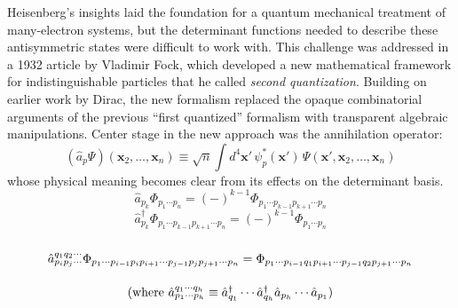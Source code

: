 Heisenberg's insights laid the foundation for a quantum mechanical treatment of
many-electron systems,\cite{Heisenberg:1926p411} but the determinant functions
needed to describe these antisymmetric states were difficult to work with.
This challenge was addressed in a 1932 article by Vladimir Fock, which developed
a new mathematical framework for indistinguishable particles that he called
{\itshape second quantization}.\cite{Fock:1932p622}
Building on earlier work by Dirac,\cite{Dirac:1927p243} the new formalism
replaced the opaque combinatorial arguments of the previous ``first quantized''
formalism with transparent algebraic manipulations.
Center stage in the new approach was the annihilation operator:
\begin{equation}
    (\hat{a}_p\Psi)(\mathbf{x}_2, \ldots, \mathbf{x}_n)
    \equiv
    \sqrt{n}
    \int
    d^4\mathbf{x}'\,
    \psi_p^*(\mathbf{x}')\,
    \Psi(\mathbf{x}', \mathbf{x}_2, \ldots, \mathbf{x}_n)
\end{equation}
whose physical meaning becomes clear from its effects on the determinant basis.
\begin{equation}
    \hat{a}_{p_k}
    \Phi_{p_1\cdots p_n}
    =
    (-)^{k-1}
    \Phi_{p_1\cdots p_{k-1} p_{k+1}\cdots p_n}
\end{equation}
\begin{equation}
    \hat{a}_{p_k}^\dagger
    \Phi_{p_1\cdots p_{k-1} p_{k+1}\cdots p_n}
    =
    (-)^{k-1}
    \Phi_{p_1\cdots p_n}
\end{equation}
\begin{equation}
    \begin{array}{c}
        \\
        \hat{a}^{q_1q_2\cdots}_{p_ip_j\cdots}
        \Phi_{%
            p_1\cdots
            p_{i-1} p_i p_{i+1}\cdots
            p_{j-1} p_j p_{j+1}\cdots
            p_n
        }
        =
        \Phi_{%
            p_1\cdots
            p_{i-1} q_1 p_{i+1}\cdots
            p_{j-1} q_2 p_{j+1}\cdots
            p_n
        }
        \\[15pt]
        \text{
            \hfill
            (%
                where
                \(
                    \hat{a}^{q_1\cdots q_h}_{p_1\cdots p_h}
                    \equiv
                    \hat{a}_{q_1}^\dagger
                    \cdots
                    \hat{a}_{q_h}^\dagger
                    \hat{a}_{p_h}
                    \cdots
                    \hat{a}_{p_1}
                \)%
            )
        }
        \\[15pt]
    \end{array}
\end{equation}
